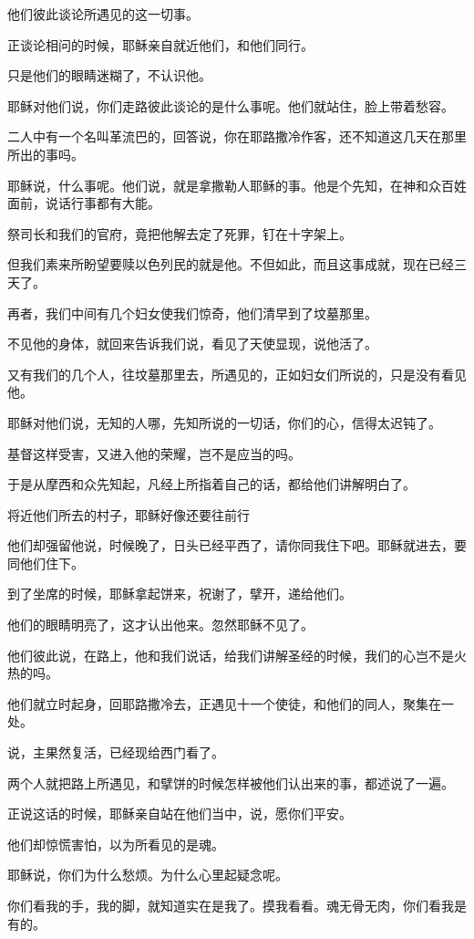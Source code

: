 \documentclass[12pt,oneside]{book}
\begin{document}
他们彼此谈论所遇见的这一切事。

正谈论相问的时候，耶稣亲自就近他们，和他们同行。

只是他们的眼睛迷糊了，不认识他。

耶稣对他们说，你们走路彼此谈论的是什么事呢。他们就站住，脸上带着愁容。

二人中有一个名叫革流巴的，回答说，你在耶路撒冷作客，还不知道这几天在那里所出的事吗。

耶稣说，什么事呢。他们说，就是拿撒勒人耶稣的事。他是个先知，在神和众百姓面前，说话行事都有大能。

祭司长和我们的官府，竟把他解去定了死罪，钉在十字架上。

但我们素来所盼望要赎以色列民的就是他。不但如此，而且这事成就，现在已经三天了。

再者，我们中间有几个妇女使我们惊奇，他们清早到了坟墓那里。

不见他的身体，就回来告诉我们说，看见了天使显现，说他活了。

又有我们的几个人，往坟墓那里去，所遇见的，正如妇女们所说的，只是没有看见他。

耶稣对他们说，无知的人哪，先知所说的一切话，你们的心，信得太迟钝了。

基督这样受害，又进入他的荣耀，岂不是应当的吗。

于是从摩西和众先知起，凡经上所指着自己的话，都给他们讲解明白了。

将近他们所去的村子，耶稣好像还要往前行

他们却强留他说，时候晚了，日头已经平西了，请你同我住下吧。耶稣就进去，要同他们住下。

到了坐席的时候，耶稣拿起饼来，祝谢了，擘开，递给他们。

他们的眼睛明亮了，这才认出他来。忽然耶稣不见了。

他们彼此说，在路上，他和我们说话，给我们讲解圣经的时候，我们的心岂不是火热的吗。

他们就立时起身，回耶路撒冷去，正遇见十一个使徒，和他们的同人，聚集在一处。

说，主果然复活，已经现给西门看了。

两个人就把路上所遇见，和擘饼的时候怎样被他们认出来的事，都述说了一遍。

正说这话的时候，耶稣亲自站在他们当中，说，愿你们平安。

他们却惊慌害怕，以为所看见的是魂。

耶稣说，你们为什么愁烦。为什么心里起疑念呢。

你们看我的手，我的脚，就知道实在是我了。摸我看看。魂无骨无肉，你们看我是有的。
\end{document}
